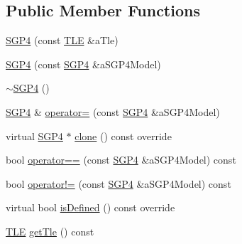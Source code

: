 \subsection*{Public Member Functions}
\begin{DoxyCompactItemize}
\item 
\hyperlink{classostk_1_1astro_1_1trajectory_1_1orbit_1_1models_1_1_s_g_p4_a84e2bc60fdf9b295e0ab8a42ecfb51ff}{S\+G\+P4} (const \hyperlink{classostk_1_1astro_1_1trajectory_1_1orbit_1_1models_1_1sgp4_1_1_t_l_e}{T\+LE} \&a\+Tle)
\item 
\hyperlink{classostk_1_1astro_1_1trajectory_1_1orbit_1_1models_1_1_s_g_p4_afe0c5fa943d25263097c242c5b289239}{S\+G\+P4} (const \hyperlink{classostk_1_1astro_1_1trajectory_1_1orbit_1_1models_1_1_s_g_p4}{S\+G\+P4} \&a\+S\+G\+P4\+Model)
\item 
\hyperlink{classostk_1_1astro_1_1trajectory_1_1orbit_1_1models_1_1_s_g_p4_a00ac84881288a79f3c876efd56c376eb}{$\sim$\+S\+G\+P4} ()
\item 
\hyperlink{classostk_1_1astro_1_1trajectory_1_1orbit_1_1models_1_1_s_g_p4}{S\+G\+P4} \& \hyperlink{classostk_1_1astro_1_1trajectory_1_1orbit_1_1models_1_1_s_g_p4_a8f8d3633270de5c9d8c99f047f28d0f0}{operator=} (const \hyperlink{classostk_1_1astro_1_1trajectory_1_1orbit_1_1models_1_1_s_g_p4}{S\+G\+P4} \&a\+S\+G\+P4\+Model)
\item 
virtual \hyperlink{classostk_1_1astro_1_1trajectory_1_1orbit_1_1models_1_1_s_g_p4}{S\+G\+P4} $\ast$ \hyperlink{classostk_1_1astro_1_1trajectory_1_1orbit_1_1models_1_1_s_g_p4_afb9928e09d66c13a77eb1126da6139eb}{clone} () const override
\item 
bool \hyperlink{classostk_1_1astro_1_1trajectory_1_1orbit_1_1models_1_1_s_g_p4_ac95f88e801e75d53c2908cfc55d743a0}{operator==} (const \hyperlink{classostk_1_1astro_1_1trajectory_1_1orbit_1_1models_1_1_s_g_p4}{S\+G\+P4} \&a\+S\+G\+P4\+Model) const
\item 
bool \hyperlink{classostk_1_1astro_1_1trajectory_1_1orbit_1_1models_1_1_s_g_p4_a6daa973c340543e56c134cd2daf867f6}{operator!=} (const \hyperlink{classostk_1_1astro_1_1trajectory_1_1orbit_1_1models_1_1_s_g_p4}{S\+G\+P4} \&a\+S\+G\+P4\+Model) const
\item 
virtual bool \hyperlink{classostk_1_1astro_1_1trajectory_1_1orbit_1_1models_1_1_s_g_p4_ab18e0666588bd517c190942b1a54ed18}{is\+Defined} () const override
\item 
\hyperlink{classostk_1_1astro_1_1trajectory_1_1orbit_1_1models_1_1sgp4_1_1_t_l_e}{T\+LE} \hyperlink{classostk_1_1astro_1_1trajectory_1_1orbit_1_1models_1_1_s_g_p4_ac1f2188866759569091ebfd8e43919a8}{get\+Tle} () const

\end{DoxyCompactItemize}
